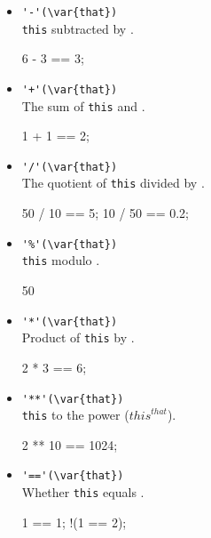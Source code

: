 \begin{itemize}
\item \lstinline|'-'(\var{that})|\\
  \lstinline|this| subtracted by .
\begin{urbiassert}[firstnumber=last]
6 - 3 == 3;
\end{urbiassert}

\item \lstinline|'+'(\var{that})|\\
  The sum of \lstinline|this| and .
\begin{urbiassert}[firstnumber=last]
1 + 1 == 2;
\end{urbiassert}

\item \lstinline|'/'(\var{that})|\\
  The quotient of \lstinline|this| divided by .
\begin{urbiassert}[firstnumber=last]
50 / 10 == 5;
10 / 50 == 0.2;
\end{urbiassert}

\item \lstinline|'%'(\var{that})|\\
  \lstinline|this| modulo .
\begin{urbiassert}[firstnumber=last]
50 %
\end{urbiassert}

\item \lstinline|'*'(\var{that})|\\
  Product of \lstinline|this| by .
\begin{urbiassert}[firstnumber=last]
2 * 3 == 6;
\end{urbiassert}

\item \lstinline|'**'(\var{that})|\\
  \lstinline|this| to the  power (${this}^{that}$).
\begin{urbiassert}[firstnumber=last]
2 ** 10 == 1024;
\end{urbiassert}

\item \lstinline|'=='(\var{that})|\\
  Whether \lstinline|this| equals .
\begin{urbiassert}[firstnumber=last]
  1 == 1;
!(1 == 2);
\end{urbiassert}
\end{itemize}


